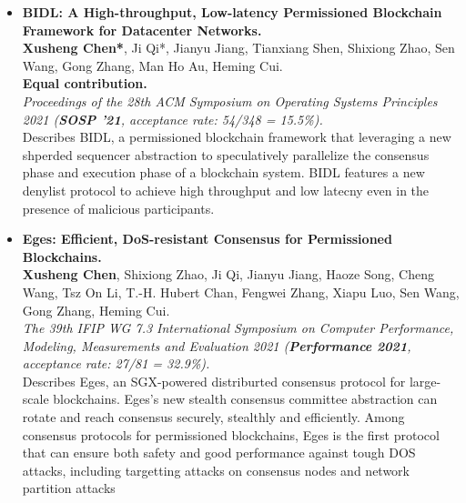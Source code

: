 \documentclass[a4paper,7pt]{article} %
\newcommand{\authors}[1]{{\small \fontfamily{cmss}\selectfont #1}}
\newcommand{\conference}[1]{\textit{\small \fontfamily{cmss}\selectfont #1}}
\newcommand{\info}[1]{{\footnotesize \fontfamily{cmss}\selectfont #1}}
\begin{document}
\begin{itemize}

    \item \textbf{BIDL: A High-throughput, Low-latency Permissioned Blockchain Framework for Datacenter Networks.} \\
    \authors{\textbf{Xusheng Chen*}, Ji Qi*, Jianyu Jiang, Tianxiang Shen, Shixiong Zhao, Sen Wang, Gong Zhang, Man Ho Au, Heming Cui.} \\
    \authors{\bf* Equal contribution.}\\
    \conference{Proceedings of the 28th ACM Symposium on Operating Systems Principles 2021 (\textbf{SOSP '21}, acceptance rate: 54/348 = 15.5\%).} \\
    \info{Describes BIDL, a permissioned blockchain framework that leveraging a new shperded sequencer abstraction to speculatively parallelize the consensus phase and execution phase 
    of a blockchain system. BIDL features a new denylist protocol to achieve high throughput and low latecny even in the presence of 
    malicious participants.}\\

    \item \textbf{Eges: Efficient, DoS-resistant Consensus for Permissioned Blockchains.} \\
    \authors{\textbf{Xusheng Chen}, Shixiong Zhao, Ji Qi,  Jianyu Jiang, Haoze Song, Cheng Wang, Tsz On Li, T.-H. Hubert Chan, Fengwei Zhang, Xiapu Luo, Sen Wang, Gong Zhang, Heming Cui.} \\
    \conference{The 39th IFIP WG 7.3 International Symposium on Computer Performance, Modeling, Measurements and Evaluation 2021 ({\bf Performance 2021}, acceptance rate: 27/81 = 32.9\%).} \\
    \info{Describes Eges, an SGX-powered distriburted consensus protocol for large-scale blockchains. Eges's new stealth consensus committee abstraction can rotate and reach consensus securely, stealthly and efficiently. Among consensus protocols for permissioned blockchains, Eges is the first protocol that can ensure both safety and good performance against tough DOS attacks, including targetting attacks on consensus nodes and network partition attacks} \\



\end{itemize}
\end{document}
